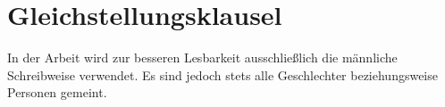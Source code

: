 \clearpage
\chapter*{Gleichstellungsklausel}
In der Arbeit wird zur besseren Lesbarkeit ausschließlich die männliche Schreibweise verwendet.
Es sind jedoch stets alle Geschlechter beziehungsweise Personen gemeint.